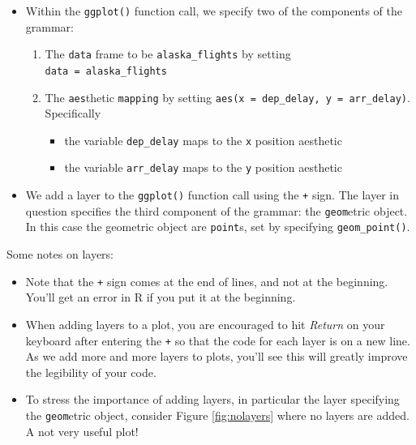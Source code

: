 \documentclass[12pt,]{krantz}
\providecommand{\tightlist}{%
  \setlength{\itemsep}{0pt}\setlength{\parskip}{0pt}}
\theoremstyle{definition}
\theoremstyle{definition}
\theoremstyle{definition}
\theoremstyle{remark}
\begin{document}
\begin{itemize}
\tightlist
\item
  Within the \texttt{ggplot()} function call, we specify two of the
  components of the grammar:

  \begin{enumerate}
  \def\labelenumi{\arabic{enumi}.}
  \tightlist
  \item
    The \texttt{data} frame to be \texttt{alaska\_flights} by setting
    \texttt{data\ =\ alaska\_flights}
  \item
    The \texttt{aes}thetic \texttt{mapping} by setting
    \texttt{aes(x\ =\ dep\_delay,\ y\ =\ arr\_delay)}. Specifically

    \begin{itemize}
    \tightlist
    \item
      the variable \texttt{dep\_delay} maps to the \texttt{x} position
      aesthetic
    \item
      the variable \texttt{arr\_delay} maps to the \texttt{y} position
      aesthetic
    \end{itemize}
  \end{enumerate}
\item
  We add a layer to the \texttt{ggplot()} function call using the
  \texttt{+} sign. The layer in question specifies the third component
  of the grammar: the \texttt{geom}etric object. In this case the
  geometric object are \texttt{point}s, set by specifying
  \texttt{geom\_point()}.
\end{itemize}

Some notes on layers:

\begin{itemize}
\tightlist
\item
  Note that the \texttt{+} sign comes at the end of lines, and not at
  the beginning. You'll get an error in R if you put it at the
  beginning.
\item
  When adding layers to a plot, you are encouraged to hit \emph{Return}
  on your keyboard after entering the \texttt{+} so that the code for
  each layer is on a new line. As we add more and more layers to plots,
  you'll see this will greatly improve the legibility of your code.
\item
  To stress the importance of adding layers, in particular the layer
  specifying the \texttt{geom}etric object, consider Figure
  \ref{fig:nolayers} where no layers are added. A not very useful plot!
\end{itemize}
\end{document}
